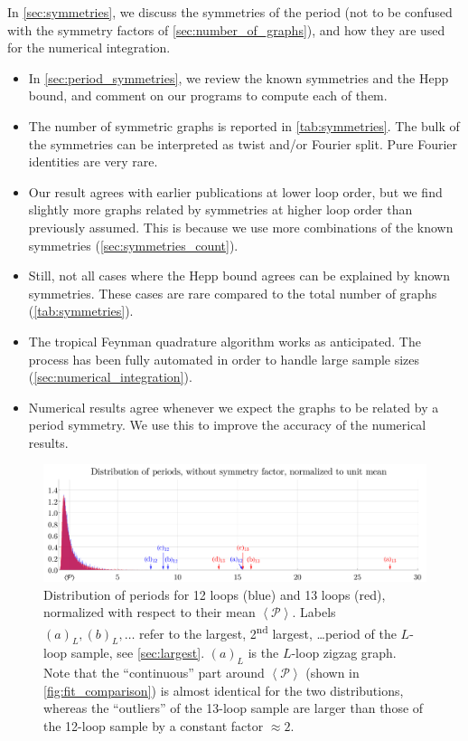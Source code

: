 \documentclass[11pt,a4paper]{article}
\newcommand{\period}{\mathcal P}
\renewcommand{\|}{\rule[-0.4ex]{0.2ex}{1.2em}}
\begin{document}
\noindent
In \cref{sec:symmetries}, we discuss the symmetries of the period (not to be confused with the symmetry factors of \cref{sec:number_of_graphs}), and how they are used for the numerical integration.
\begin{itemize}
	\item In \cref{sec:period_symmetries}, we review the known symmetries and the Hepp bound, and comment on our programs to compute each of them. 
	\item The number of symmetric graphs is reported in \cref{tab:symmetries}.  The bulk of the symmetries can be interpreted as twist and/or Fourier split. Pure Fourier identities are very rare.
	\item  Our result agrees with earlier publications at lower loop order, but we find slightly more graphs related by symmetries at higher loop order than previously assumed. This is because we use more combinations of the known symmetries  (\cref{sec:symmetries_count}). 
	\item Still, not all cases where the Hepp bound agrees can be explained by known symmetries. These cases are rare  compared to the total number of graphs (\cref{tab:symmetries}).
	\item The tropical Feynman quadrature algorithm  \cite{borinsky_tropical_2023a} works as anticipated. The process has been fully automated in order to handle  large sample sizes (\cref{sec:numerical_integration}).
	\item Numerical results agree whenever we expect the graphs to be related by a period symmetry. We use this to improve the accuracy of the numerical results.
\end{itemize}

\FloatBarrier


\begin{figure} 
	\centering
	\includegraphics[width=.9\linewidth]{distribution.pdf}
	\caption{Distribution of periods for 12 loops (blue) and 13 loops (red), normalized with respect to their mean $\left \langle \period \right \rangle $. Labels $(a)_L, (b)_L, \ldots$ refer to the largest, 2\textsuperscript{nd} largest, \ldots period of the $L$-loop sample, see \cref{sec:largest}. $(a)_L$ is the $L$-loop zigzag graph. Note that the \enquote{continuous} part around $\left \langle \period \right \rangle $  (shown in \cref{fig:fit_comparison}) is almost identical for the two distributions, whereas the \enquote{outliers} of the 13-loop sample  are larger than those of the 12-loop sample by a constant factor $\approx  2$. }
	\label{fig:distribution}
\end{figure}
	
\end{document}

